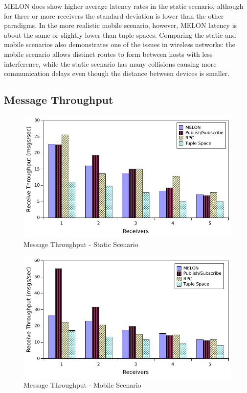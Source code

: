 MELON does show higher average latency rates in the static scenario, although for three or more receivers the standard deviation is lower than the other paradigms. In the more realistic mobile scenario, however, MELON latency is about the same or slightly lower than tuple spaces. Comparing the static and mobile scenarios also demonstrates one of the issues in wireless networks: the mobile scenario allows distinct routes to form between hosts with less interference, while the static scenario has many collisions causing more communication delays even though the distance between devices is smaller.

\subsection{Message Throughput}

\begin{figure}
\centering
\includegraphics[width = \linewidth, clip, trim = 0px 0px 0px 0px]{figures/throughput_static.pdf}
\caption{Message Throughput - Static Scenario}
\label{fig:throughputstatic}
\end{figure}

\begin{figure}
\centering
\includegraphics[width = \linewidth, clip, trim = 0px 0px 0px 0px]{figures/throughput_mobile.pdf}
\caption{Message Throughput - Mobile Scenario}
\label{fig:throughputmobile}
\end{figure}

